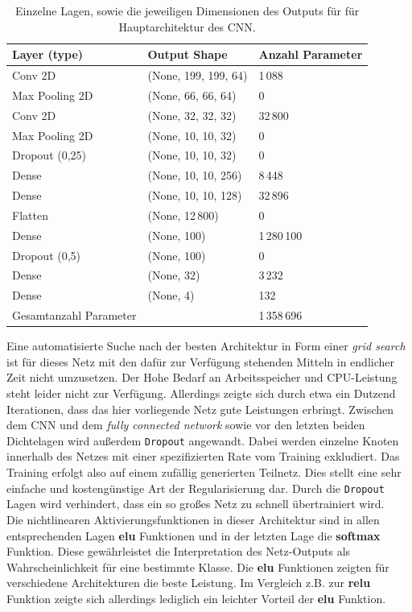\begin{table}[htb]
  \centering
  \begin{tabular}{l
                  l
                  l}
      \toprule
      Layer (type)    & Output Shape     & Anzahl Parameter      \\
      \midrule
      Conv 2D         & (None, 199, 199, 64)  & 1\,088 \\
      Max Pooling 2D  & (None, 66, 66, 64)    & 0 \\
      Conv 2D         & (None, 32, 32, 32)    & 32\,800 \\
      Max Pooling 2D  & (None, 10, 10, 32)    & 0 \\
      Dropout (0,25)  & (None, 10, 10, 32)    & 0 \\
      Dense           & (None, 10, 10, 256)   & 8\,448 \\
      Dense           & (None, 10, 10, 128)   & 32\,896 \\
      Flatten         & (None, 12\,800)         & 0 \\
      Dense           & (None, 100)           & 1\,280\,100 \\
      Dropout (0,5)   & (None, 100)           & 0 \\
      Dense           & (None, 32)            & 3\,232 \\
      Dense           & (None, 4)             & 132 \\
      \midrule
      Gesamtanzahl Parameter &                & 1\,358\,696 \\
      \bottomrule
  \end{tabular}
  \label{tab:haupt}
  \caption{Einzelne Lagen, sowie die jeweiligen Dimensionen des Outputs für für Hauptarchitektur des CNN.}
\end{table}

Eine automatisierte Suche nach der besten Architektur in Form einer
\textit{grid search} ist für dieses Netz mit den dafür zur Verfügung stehenden
Mitteln in endlicher Zeit nicht umzusetzen. Der Hohe Bedarf an Arbeitsspeicher
und CPU-Leistung steht leider nicht zur Verfügung. Allerdings zeigte sich durch
etwa ein Dutzend Iterationen, dass das hier vorliegende Netz gute Leistungen
erbringt. Zwischen dem CNN und dem \textit{fully connected network} sowie vor
den letzten beiden Dichtelagen wird außerdem \texttt{Dropout} angewandt.
Dabei werden einzelne Knoten innerhalb des Netzes mit einer spezifizierten Rate
vom Training exkludiert. Das Training erfolgt also auf einem zufällig
generierten Teilnetz. Dies stellt eine sehr einfache und kostengünstige Art
der Regularisierung dar. Durch die \texttt{Dropout} Lagen wird verhindert,
dass ein so großes Netz zu schnell übertrainiert wird. \\
Die nichtlinearen Aktivierungsfunktionen in dieser Architektur sind in allen
entsprechenden Lagen \textbf{elu} Funktionen und in der letzten Lage die
\textbf{softmax} Funktion. Diese gewährleistet die Interpretation des
Netz-Outputs als Wahrscheinlichkeit für eine bestimmte Klasse.
Die \textbf{elu} Funktionen zeigten für verschiedene Architekturen die beste
Leistung. Im Vergleich z.B. zur \textbf{relu} Funktion zeigte sich allerdings
lediglich ein leichter Vorteil der \textbf{elu} Funktion.\\

